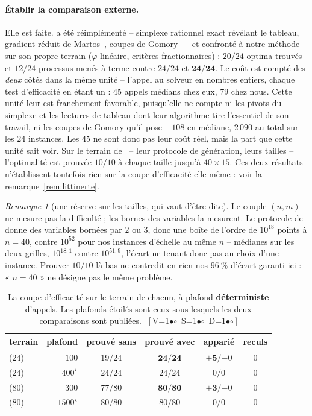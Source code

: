 \documentclass[11pt,a4paper]{article}
\theoremstyle{plain}
\theoremstyle{remark}
\newtheorem{remark}{Remarque}
\newcommand{\cfgm}[1]{\ifnum#1=1$\bullet$\else$\circ$\fi}
\newcommand{\conf}[3]{%
  \textsf{\footnotesize[\,V\cfgm{#1}\ S\cfgm{#2}\ D\cfgm{#3}\,]}}
\begin{document}
\paragraph{Établir la comparaison externe.} Elle est faite.
\cite{zerdani2011} a été réimplémenté -- simplexe rationnel exact révélant
le tableau, gradient réduit de Martos~\cite{martos1975}, coupes de
Gomory~\cite{gomory1958} -- et confronté à
notre méthode sur son propre terrain ($\varphi$ linéaire, critères
fractionnaires) : $20/24$ optima trouvés et $12/24$ processus menés à terme
contre $24/24$ et $\mathbf{24/24}$. Le coût est compté des \emph{deux}
côtés dans la même unité -- l'appel au solveur en nombres entiers, chaque
test d'efficacité en étant un : $45$ appels médians chez eux, $79$ chez
nous. Cette unité leur est franchement favorable, puisqu'elle ne compte ni
les pivots du simplexe et les lectures de tableau dont leur algorithme tire
l'essentiel de son travail, ni les coupes de Gomory qu'il pose -- $108$ en
médiane, $2\,090$ au total sur les $24$ instances. Les $45$ ne sont donc pas
leur coût réel, mais la part que cette unité sait voir. Sur le terrain
de~\cite{drici2018} -- leur protocole de génération, leurs tailles --
l'optimalité est prouvée $10/10$ à chaque taille jusqu'à $40\times15$. Ces
deux résultats n'établissent toutefois rien sur la coupe d'efficacité
elle-même : voir la remarque~\ref{rem:littinerte}.

\begin{remark}[une réserve sur les tailles, qui vaut d'être dite]
Le couple $(n,m)$ ne mesure pas la difficulté ; les bornes des variables la
mesurent. Le protocole de~\cite{drici2018} donne des variables bornées par
$2$ ou $3$, donc une boîte de l'ordre de $10^{18}$ points à $n=40$, contre
$10^{52}$ pour nos instances d'échelle au même $n$ -- médianes sur les deux
grilles, $10^{18{,}1}$ contre $10^{51{,}9}$, l'écart ne tenant donc pas au
choix d'une instance. Prouver $10/10$ là-bas
ne contredit en rien nos $96\ \%$ d'écart garanti ici : « $n=40$ » ne désigne
pas le même problème.
\end{remark}


\begin{table}[H]
\centering
\caption{La coupe d'efficacité sur le terrain de chacun, à plafond
\textbf{déterministe} d'appels. Les plafonds étoilés sont ceux sous lesquels
les deux comparaisons sont publiées.\ \conf{1}{1}{1}}
\label{tab:littdeterm}
\setlength{\tabcolsep}{5pt}
\begin{tabular}{lrcccc}
\toprule
terrain & plafond & prouvé sans & prouvé avec & apparié & reculs\\
\midrule
\cite{zerdani2011} ($24$) & $100$ & $19/24$ & $\mathbf{24/24}$
 & $\mathbf{+5}/{-0}$ & $0$\\
\cite{zerdani2011} ($24$) & $400^{\star}$ & $24/24$ & $24/24$ & $0/0$ & $0$\\
\midrule
\cite{drici2018} ($80$) & $300$ & $77/80$ & $\mathbf{80/80}$
 & $\mathbf{+3}/{-0}$ & $0$\\
\cite{drici2018} ($80$) & $1500^{\star}$ & $80/80$ & $80/80$ & $0/0$ & $0$\\
\bottomrule
\end{tabular}
\end{table}
\end{document}
